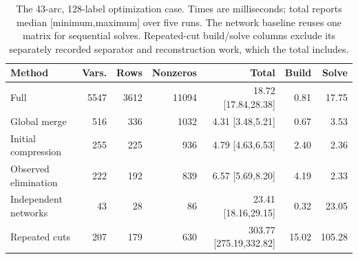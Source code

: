 \begin{table}[tb]\centering\footnotesize
\caption{The 43-arc, 128-label optimization case. Times are milliseconds; total reports median [minimum,maximum] over five runs. The network baseline reuses one matrix for sequential solves. Repeated-cut build/solve columns exclude its separately recorded separator and reconstruction work, which the total includes.}
\label{tab:computation-opt}
\setlength{\tabcolsep}{3pt}
\begin{tabular}{lrrr rrr}\toprule
Method & Vars. & Rows & Nonzeros & Total & Build & Solve\\\midrule
Full & 5547 & 3612 & 11094 & 18.72 [17.84,28.38] & 0.81 & 17.75 \\
Global merge & 516 & 336 & 1032 & 4.31 [3.48,5.21] & 0.67 & 3.53 \\
Initial compression & 255 & 225 & 936 & 4.79 [4.63,6.53] & 2.40 & 2.36 \\
Observed elimination & 222 & 192 & 839 & 6.57 [5.69,8.20] & 4.19 & 2.33 \\
Independent networks & 43 & 28 & 86 & 23.41 [18.16,29.15] & 0.32 & 23.05 \\
Repeated cuts & 207 & 179 & 630 & 303.77 [275.19,332.82] & 15.02 & 105.28 \\
\bottomrule\end{tabular}\end{table}
